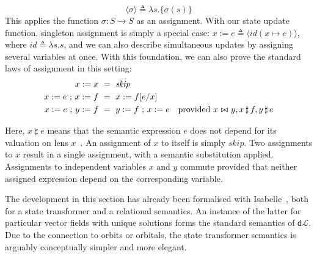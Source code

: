 \documentclass[envcountsame,envcountsect]{llncs}
\newcommand{\sskip}{\mathit{skip}}
\newcommand{\dL}{\mathsf{d}\mathcal{L}}
\newcommand{\Pow}{\mathcal{P}}
\newcommand{\reals}{\mathbb{R}}
\newcommand{\defs}{\triangleq}
\newcommand{\lindep}{\mathop{\,\bowtie\,}}
\newcommand{\unrest}{\mathop{\sharp}}
\newcommand{\seq}{\mathop{\,;\,}}
\begin{document}
\begin{equation}
  \langle \sigma \rangle \defs \lambda s. \{ \sigma(s) \} \tag{st-assgn}
\end{equation}
%
This applies the function $\sigma : S \to S$ as an assignment. With
our state update function, singleton assignment is simply a special
case: $x := e \defs \langle id(x \mapsto e) \rangle$, where
$id \defs \lambda s. s$, and we can also describe simultaneous updates
by assigning several variables at once. With this foundation, we can
also prove the standard laws of assignment in this setting:
%
\begin{align*}
  x := x &~=~ \sskip \\
  x := e \seq x := f &~=~ x := f[e/x] \\
  x := e \seq y := f &~=~ y := f \seq x := e & \textnormal{provided~} x \lindep y, x \unrest f, y \unrest e
\end{align*}

Here, $x \unrest e$ means that the semantic expression $e$ does not
depend for its valuation on lens $x$~\cite{FosterZW16}. An assignment
of $x$ to itself is simply $\sskip$. Two assignments to $x$ result in
a single assignment, with a semantic substitution applied. Assignments
to independent variables $x$ and $y$ commute provided that neither
assigned expression depend on the corresponding variable.


The development in this section has already been formalised with
Isabelle~\cite{afp:hybrid}, both for a state transformer and a
relational semantics. An instance of the latter for particular vector
fields with unique solutions forms the standard semantics of
$\dL$. Due to the connection to orbits or orbitals, the state
transformer semantics is arguably conceptually simpler and more
elegant.
\end{document}
